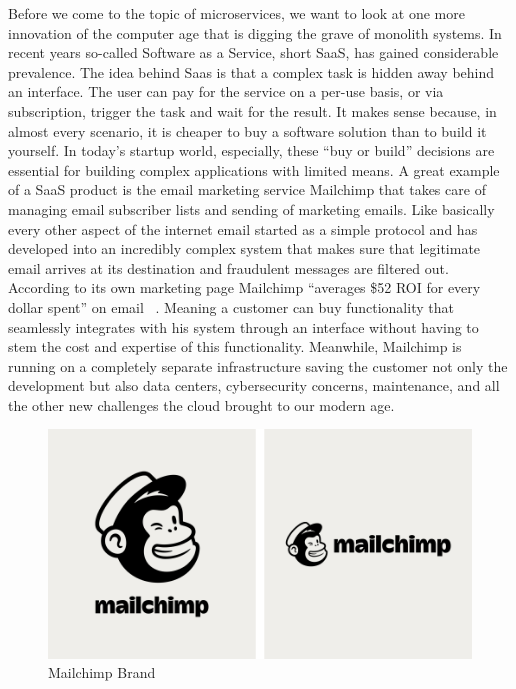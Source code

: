 Before we come to the topic of microservices, we want to look at one more innovation of the computer age that is digging the grave of monolith systems. In recent years so-called Software as a Service, short SaaS, has gained considerable prevalence. The idea behind Saas is that a complex task is hidden away behind an interface. The user can pay for the service on a per-use basis, or via subscription, trigger the task and wait for the result. It makes sense because, in almost every scenario, it is cheaper to buy a software solution than to build it yourself. In today's startup world, especially, these ``buy or build'' decisions are essential for building complex applications with limited means. A great example of a SaaS product is the email marketing service Mailchimp that takes care of managing email subscriber lists and sending of marketing emails. Like basically every other aspect of the internet email started as a simple protocol and has developed into an incredibly complex system that makes sure that legitimate email arrives at its destination and fraudulent messages are filtered out. According to its own marketing page Mailchimp ``averages \$52 ROI for every dollar spent'' on email ~\cite{mailchimp.2020}. Meaning a customer can buy functionality that seamlessly integrates with his system through an interface without having to stem the cost and expertise of this functionality. Meanwhile, Mailchimp is running on a completely separate infrastructure saving the customer not only the development but also data centers, cybersecurity concerns, maintenance, and all the other new challenges the cloud brought to our modern age.

\begin{figure}[ht]
  \centering
  \includegraphics[width=0.8\linewidth]{assets/mailchimp-brand.png}
  \caption[Mailchimp Brand]{Mailchimp Brand ~\cite{mailchimp.2020}}
\end{figure}

